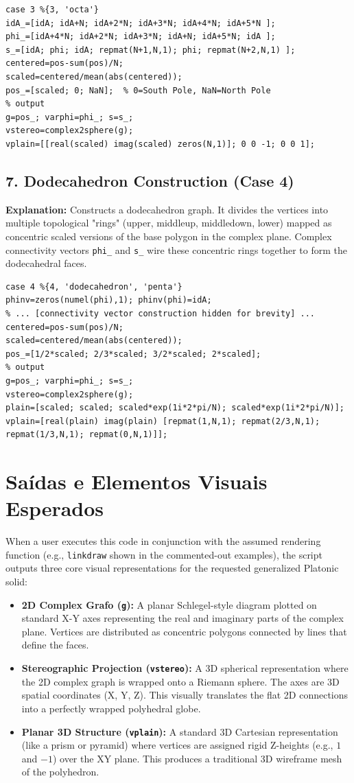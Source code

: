 \begin{lstlisting}
case 3 %{3, 'octa'}
idA_=[idA; idA+N; idA+2*N; idA+3*N; idA+4*N; idA+5*N ];
phi_=[idA+4*N; idA+2*N; idA+3*N; idA+N; idA+5*N; idA ];
s_=[idA; phi; idA; repmat(N+1,N,1); phi; repmat(N+2,N,1) ];
centered=pos-sum(pos)/N; 
scaled=centered/mean(abs(centered)); 
pos_=[scaled; 0; NaN];  % 0=South Pole, NaN=North Pole
% output
g=pos_; varphi=phi_; s=s_;
vstereo=complex2sphere(g); 
vplain=[[real(scaled) imag(scaled) zeros(N,1)]; 0 0 -1; 0 0 1];
\end{lstlisting}

\subsection{7. Dodecahedron Construction (Case 4)}
\textbf{Explanation:} 
Constructs a dodecahedron graph. It divides the vertices into multiple topological "rings" (upper, middleup, middledown, lower) mapped as concentric scaled versions of the base polygon in the complex plane. Complex connectivity vectors \texttt{phi\_} and \texttt{s\_} wire these concentric rings together to form the dodecahedral faces.

\begin{lstlisting}
case 4 %{4, 'dodecahedron', 'penta'}
phinv=zeros(numel(phi),1); phinv(phi)=idA;
% ... [connectivity vector construction hidden for brevity] ...
centered=pos-sum(pos)/N; 
scaled=centered/mean(abs(centered)); 
pos_=[1/2*scaled; 2/3*scaled; 3/2*scaled; 2*scaled]; 
% output
g=pos_; varphi=phi_; s=s_;
vstereo=complex2sphere(g); 
plain=[scaled; scaled; scaled*exp(1i*2*pi/N); scaled*exp(1i*2*pi/N)]; 
vplain=[real(plain) imag(plain) [repmat(1,N,1); repmat(2/3,N,1); repmat(1/3,N,1); repmat(0,N,1)]];
\end{lstlisting}

\section{Saídas e Elementos Visuais Esperados}
When a user executes this code in conjunction with the assumed rendering function (e.g., \texttt{linkdraw} shown in the commented-out examples), the script outputs three core visual representations for the requested generalized Platonic solid:
\begin{itemize}
    \item \textbf{2D Complex Grafo (\texttt{g}):} A planar Schlegel-style diagram plotted on standard X-Y axes representing the real and imaginary parts of the complex plane. Vertices are distributed as concentric polygons connected by lines that define the faces.
    \item \textbf{Stereographic Projection (\texttt{vstereo}):} A 3D spherical representation where the 2D complex graph is wrapped onto a Riemann sphere. The axes are 3D spatial coordinates (X, Y, Z). This visually translates the flat 2D connections into a perfectly wrapped polyhedral globe.
    \item \textbf{Planar 3D Structure (\texttt{vplain}):} A standard 3D Cartesian representation (like a prism or pyramid) where vertices are assigned rigid Z-heights (e.g., $1$ and $-1$) over the XY plane. This produces a traditional 3D wireframe mesh of the polyhedron.
\end{itemize}
